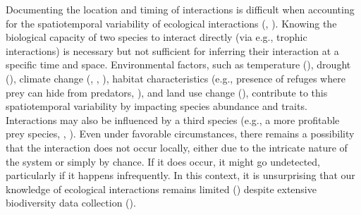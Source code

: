 Documenting the location and timing of interactions is difficult when accounting
for the spatiotemporal variability of ecological interactions
(\cite{Poisot2012Dissimilarity}, \cite{Poisot2015Species}). Knowing the
biological capacity of two species to interact directly (via e.g., trophic
interactions) is necessary but not sufficient for inferring their interaction at
a specific time and space. Environmental factors, such as temperature
(\cite{Angilletta2004Temperature}), drought (\cite{Woodward2012Climate}),
climate change (\cite{Gilman2010Framework}, \cite{Woodward2010Chapter},
\cite{Araujo2011Usinga}), habitat characteristics (e.g., presence of refuges
where prey can hide from predators, \cite{Grabowski2004Habitat}), and land use
change (\cite{Tylianakis2007Habitat}), contribute to this spatiotemporal
variability by impacting species abundance and traits. Interactions may also be
influenced by a third species (e.g., a more profitable prey species,
\cite{Golubski2011Modifying}, \cite{Sanders2012Indirect}). Even under favorable
circumstances, there remains a possibility that the interaction does not occur
locally, either due to the intricate nature of the system or simply by chance.
If it does occur, it might go undetected, particularly if it happens
infrequently. In this context, it is unsurprising that our knowledge of
ecological interactions remains limited (\cite{Hortal2015Seven}) despite
extensive biodiversity data collection (\cite{Schmeller2015Global}). 

